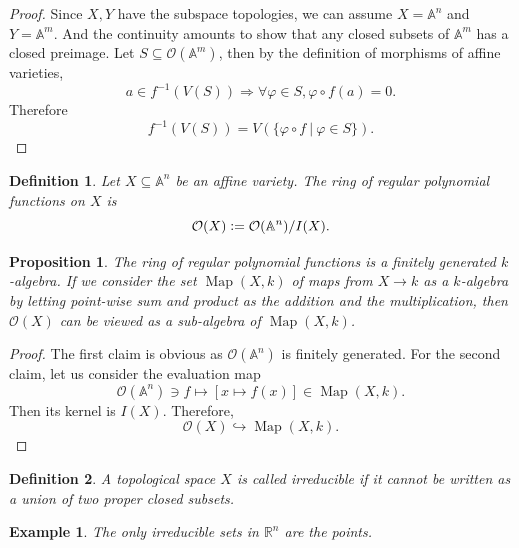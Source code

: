 \documentclass[10pt]{article}
\newtheorem{proposition}{Proposition}[section]
\newtheorem{definition}{Definition}[section]
\newtheorem{example}{Example}[section]
\numberwithin{equation}{theorem}
\DeclareMathOperator{\Map}{Map}
\newcommand{\defeq}{\vcentcolon=}
\newcommand{\R}[0]{\mathbb{R}}
\newcommand{\A}[0]{\mathbb{A}}
\begin{document}
\begin{proof}
Since $X,Y$ have the subspace topologies, we can assume $X=\A^n$ and $Y=\A^m$. And the continuity amounts to show that any closed subsets of $\A^m$ has a closed preimage. Let $S\subseteq\mathcal{O}(\A^m)$, then by the definition of morphisms of affine varieties,
\begin{equation*}
a\in f^{-1}(V(S))\Rightarrow \forall\varphi\in S, \varphi\circ f(a) = 0.
\end{equation*}
Therefore
\begin{equation*}
f^{-1}(V(S)) = V(\{\varphi\circ f\:|\: \varphi\in S\}).
\end{equation*}
\end{proof}

\begin{definition}
Let $X\subseteq\A^n$ be an affine variety. The ring of regular polynomial functions on $X$ is 
\begin{equation*}
\mathcal{O}(X)\defeq\mathcal{O}(\A^n)/I(X).
\end{equation*}
\label{definition_1_8}
\end{definition}

\begin{proposition}
The ring of regular polynomial functions is a finitely generated $k$-algebra. If we consider the set $\Map(X,k)$ of maps from $X\to k$ as a $k$-algebra by letting point-wise sum and product as the addition and the multiplication, then $\mathcal{O}(X)$ can be
viewed as a sub-algebra of $\Map(X,k)$. 
\end{proposition}
\begin{proof}
The first claim is obvious as $\mathcal{O}(\A^n)$ is finitely generated. For the second claim, let us consider the evaluation map
\begin{equation*}
\mathcal{O}(\A^n)\ni f\mapsto [x\mapsto f(x)]\in\Map(X,k).
\end{equation*}
Then its kernel is $I(X)$. Therefore,
\begin{equation*}
\mathcal{O}(X)\hookrightarrow \Map(X,k).
\end{equation*}
\end{proof}

\begin{definition}
A topological space $X$ is called irreducible if it cannot be written as a union of two proper closed subsets.
\end{definition}

\begin{example}
The only irreducible sets in $\R^n$ are the points.
\end{example}
\end{document}
